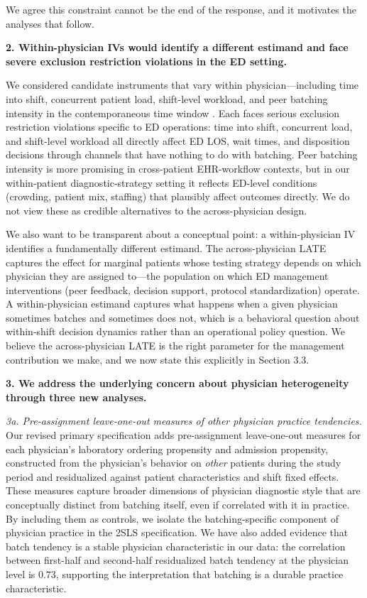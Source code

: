 \documentclass[11pt]{article}
\newcommand{\1}{\hbox{\rm 1\kern-.35em 1}}
\begin{document}
We agree this constraint cannot be the end of the response, and it motivates the analyses that follow.

\textbf{2. Within-physician IVs would identify a different estimand and face severe exclusion restriction violations in the ED setting.}

We considered candidate instruments that vary within physician---including time into shift, concurrent patient load, shift-level workload, and peer batching intensity in the contemporaneous time window \citep[similar in spirit to][]{luo2026batch}. Each faces serious exclusion restriction violations specific to ED operations: time into shift, concurrent load, and shift-level workload all directly affect ED LOS, wait times, and disposition decisions through channels that have nothing to do with batching. Peer batching intensity is more promising in cross-patient EHR-workflow contexts, but in our within-patient diagnostic-strategy setting it reflects ED-level conditions (crowding, patient mix, staffing) that plausibly affect outcomes directly. We do not view these as credible alternatives to the across-physician design.

We also want to be transparent about a conceptual point: a within-physician IV identifies a fundamentally different estimand. The across-physician LATE captures the effect for marginal patients whose testing strategy depends on which physician they are assigned to---the population on which ED management interventions (peer feedback, decision support, protocol standardization) operate. A within-physician estimand captures what happens when a given physician sometimes batches and sometimes does not, which is a behavioral question about within-shift decision dynamics rather than an operational policy question. We believe the across-physician LATE is the right parameter for the management contribution we make, and we now state this explicitly in Section 3.3.

\textbf{3. We address the underlying concern about physician heterogeneity through three new analyses.}

\textit{3a. Pre-assignment leave-one-out measures of other physician practice tendencies.} Our revised primary specification adds pre-assignment leave-one-out measures for each physician's laboratory ordering propensity and admission propensity, constructed from the physician's behavior on \textit{other} patients during the study period and residualized against patient characteristics and shift fixed effects. These measures capture broader dimensions of physician diagnostic style that are conceptually distinct from batching itself, even if correlated with it in practice. By including them as controls, we isolate the batching-specific component of physician practice in the 2SLS specification. We have also added evidence that batch tendency is a stable physician characteristic in our data: the correlation between first-half and second-half residualized batch tendency at the physician level is $0.73$, supporting the interpretation that batching is a durable practice characteristic.
\end{document}
